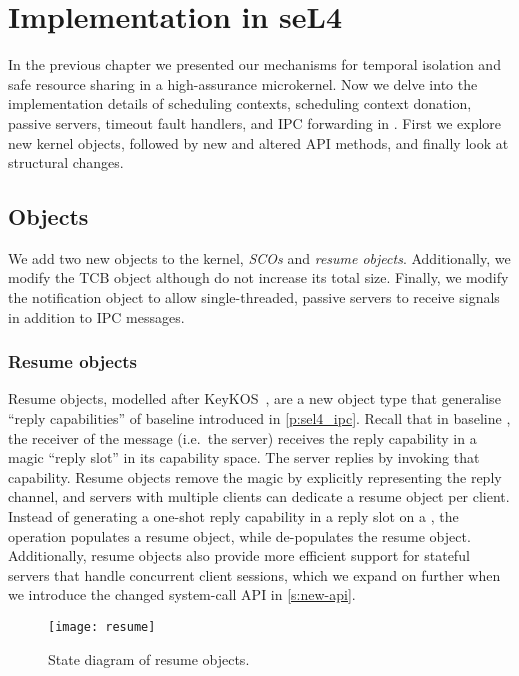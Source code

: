 \chapter{Implementation in seL4}
\label{chap:implementation}

In the previous chapter we presented our mechanisms for temporal isolation and safe resource sharing
in a high-assurance microkernel. 
Now we delve into the implementation details of scheduling contexts, scheduling context donation,
passive servers, timeout fault handlers, and IPC forwarding in \selfour. First we explore new kernel
objects, followed by new and altered API methods, and finally look at structural changes.

\section{Objects}

We add two new objects to the kernel, \emph{\glspl{SCO}} and \emph{resume objects}. Additionally, we modify
the \gls{TCB} object although do not increase its total size. Finally, we modify the notification
object to allow single-threaded, passive servers to receive signals in
addition to IPC messages.

\subsection{Resume objects}
\label{s:resume}

Resume objects, modelled after KeyKOS~\citep{Bomberger_FFHLS_92}, are a new object type that
generalise ``reply capabilities'' of baseline \selfour introduced in \cref{p:sel4_ipc}.  Recall that in
baseline \selfour, the receiver of the message (i.e.\ the server) receives the reply capability in a
magic ``reply slot'' in its capability space. The server replies by invoking that capability. Resume
objects remove the magic by explicitly representing the reply channel, and servers with multiple
clients can dedicate a resume object per client.  Instead of generating a one-shot reply capability
in a reply slot on a \call, the operation populates a resume object, while \recv de-populates the
resume object.  Additionally, resume objects also provide more efficient support for stateful servers that handle concurrent
client sessions, which we expand on further when we introduce the changed system-call \gls{API} in
\cref{s:new-api}.

\begin{figure}[t]
    \centering
    \texttt{[image: resume]}
    \caption{State diagram of resume objects.}
    \label{f:resume-state-diagram}
\end{figure}

